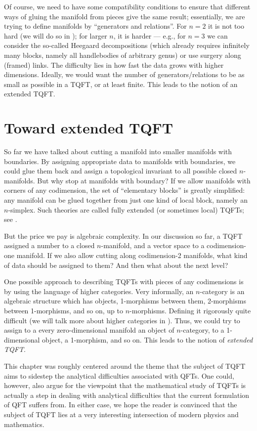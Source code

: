 Of course, we need to have some compatibility conditions to ensure that
different ways of gluing the manifold from pieces give the same result;
essentially, we are trying to define manifolds by ``generators and
relations''. For $n=2$ it is not too hard (we will do so in
); for larger $n$, it is harder --- e.g., for
$n=3$ we can consider the so-called Heegaard decompositions (which already
requires infinitely many blocks, namely all handlebodies of arbitrary
genus) or use surgery along (framed) links. The difficulty lies in how fast the data
grows with higher dimensions. Ideally, we would want the number of
generators/relations to be as small as possible in a TQFT, or at least
finite. This leads to the notion of an extended TQFT.

\section{Toward extended TQFT}\label{s:xtqft}
So far we have talked about cutting a manifold into smaller manifolds with
boundaries. By assigning appropriate data to manifolds with boundaries, we
could glue them back and assign a topological invariant to all possible closed
$n$-manifolds. But why stop at manifolds with boundary? If we allow manifolds
with corners of any codimension, the set of ``elementary blocks'' is greatly
simplified: any manifold can be glued together from just one kind of local
block, namely an $n$-simplex. Such theories are called fully extended (or
sometimes local) TQFTs; see \cite{lurie-cobordism}.

But the price we pay is algebraic complexity. In our discussion so far, a TQFT
assigned a number to a closed $n$-manifold, and a vector space to a
codimension-one manifold. If we also allow cutting along codimension-2
manifolds, what kind of data should be assigned to them? And then what about the
next level?


One possible approach to describing  TQFTs with pieces of any codimensions
is by using the language of higher categories. Very informally, an
$n$-category is an algebraic structure which has objects, 1-morphisms
between them, 2-morphisms between 1-morphisms, and so on, up to
$n$-morphisms. Defining it rigorously quite difficult (we will talk more
about higher categories in ). Thus, we could try to
assign to a every zero-dimensional manifold an object of $n$-category, to a
1-dimensional object, a 1-morphism, and so on. This leads to the notion of
\emph{extended TQFT}.


This chapter was roughly centered around the theme that the subject of TQFT
aims to sidestep the analytical difficulties associated with QFTs. One could,
however, also argue for the viewpoint that the mathematical study of TQFTs is
actually a step in dealing with analytical difficulties that the current
formulation of QFT suffers from. In either case, we hope the reader is
convinced that the subject of TQFT lies at a very interesting intersection of
modern physics and mathematics.


